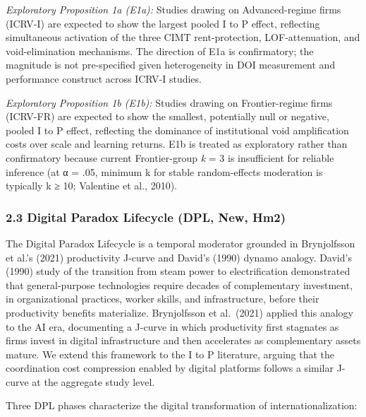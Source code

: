 \documentclass[
  12pt,a4paper]{article}
\begin{document}
\emph{Exploratory Proposition 1a (E1a):} Studies drawing on
Advanced-regime firms (ICRV-I) are expected to show the largest pooled I
to P effect, reflecting simultaneous activation of the three CIMT
rent-protection, LOF-attenuation, and void-elimination mechanisms. The
direction of E1a is confirmatory; the magnitude is not pre-specified
given heterogeneity in DOI measurement and performance construct across
ICRV-I studies.

\emph{Exploratory Proposition 1b (E1b):} Studies drawing on
Frontier-regime firms (ICRV-FR) are expected to show the smallest,
potentially null or negative, pooled I to P effect, reflecting the
dominance of institutional void amplification costs over scale and
learning returns. E1b is treated as exploratory rather than confirmatory
because current Frontier-group \emph{k} = 3 is insufficient for reliable
inference (at α = .05, minimum k for stable random-effects moderation is
typically k ≥ 10; Valentine et al., 2010).

\hypertarget{digital-paradox-lifecycle-dpl-new-hm2}{%
\subsubsection{2.3 Digital Paradox Lifecycle (DPL, New,
Hm2)}\label{digital-paradox-lifecycle-dpl-new-hm2}}

The Digital Paradox Lifecycle is a temporal moderator grounded in
Brynjolfsson et al.'s (2021) productivity J-curve and David's (1990)
dynamo analogy. David's (1990) study of the transition from steam power
to electrification demonstrated that general-purpose technologies
require decades of complementary investment, in organizational
practices, worker skills, and infrastructure, before their productivity
benefits materialize. Brynjolfsson et al.~(2021) applied this analogy to
the AI era, documenting a J-curve in which productivity first stagnates
as firms invest in digital infrastructure and then accelerates as
complementary assets mature. We extend this framework to the I to P
literature, arguing that the coordination cost compression enabled by
digital platforms follows a similar J-curve at the aggregate study
level.

Three DPL phases characterize the digital transformation of
internationalization:
\end{document}

